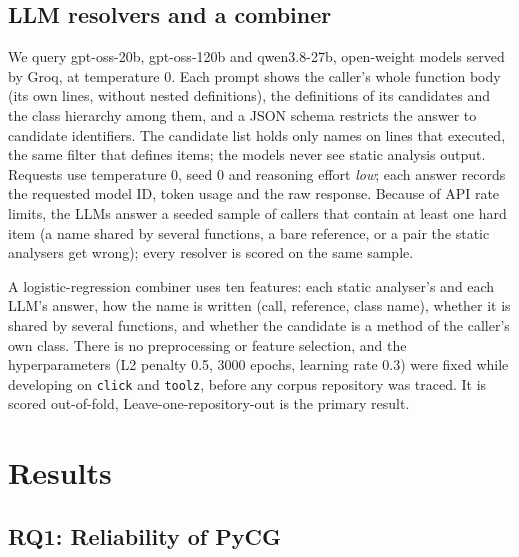 \documentclass[conference]{IEEEtran}
\providecommand{\rqFourSampleNote}{}
\providecommand{\rqFourCvNote}{\pending}
\begin{document}
\subsection{LLM resolvers and a combiner}

We query gpt-oss-20b, gpt-oss-120b and qwen3.8-27b, open-weight models served by Groq, at
temperature 0. Each prompt shows the caller's whole function body (its own lines, without
nested definitions), the definitions of its candidates and the class hierarchy among them, and a
JSON schema restricts the answer to candidate identifiers. The candidate list holds only names on
lines that executed, the same filter that defines items; the models never see static analysis
output. Requests use temperature 0, seed 0 and reasoning effort \emph{low}; each answer records the
requested model ID, token usage and the raw response. Because of API rate limits, the LLMs answer a seeded sample of callers
that contain at least one hard item (a name shared by several functions, a bare reference, or a
pair the static analysers get wrong); every resolver is scored on the same sample.
\rqFourSampleNote{}

A logistic-regression combiner uses ten features: each static analyser's and each LLM's answer,
how the name is written (call, reference, class name), whether it is shared by several
functions, and whether the candidate is a method of the caller's own class. There is no preprocessing or
feature selection, and the hyperparameters (L2 penalty 0.5, 3000 epochs, learning rate 0.3) were
fixed while developing on \texttt{click} and \texttt{toolz}, before any corpus repository was
traced. It is scored out-of-fold, \rqFourCvNote{} Leave-one-repository-out is the primary result.

\section{Results}

\subsection{RQ1: Reliability of PyCG}
\end{document}
